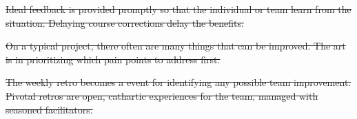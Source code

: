 \sout{Ideal feedback is provided promptly so that the individual or team learn from the situation. Delaying course corrections delay the benefits.} %


\sout{On a typical project, there often are many things that can be improved. The art is in prioritizing which pain points to address first. }


\sout{The weekly retro becomes a  event for identifying any possible team improvement. Pivotal retros are open, cathartic experiences for the team, managed with seasoned facilitators. }


